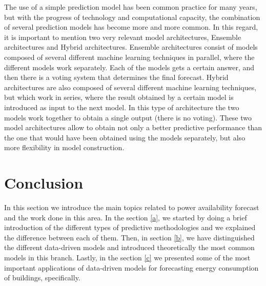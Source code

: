 The use of a simple prediction model has been common practice for many years, but with the progress of technology and computational capacity, the combination of several prediction models has become more and more common. In this regard, it is important to mention two very relevant model architectures, Ensemble architectures and Hybrid architectures. Ensemble architectures consist of models composed of several different machine learning techniques in parallel, where the different models work separately. Each of the models gets a certain answer, and then there is a voting system that determines the final forecast. Hybrid architectures are also composed of several different machine learning techniques, but which work in series, where the result obtained by a certain model is introduced as input to the next model. In this type of architecture the two models work together to obtain a single output (there is no voting). These two model architectures allow to obtain not only a better predictive performance than the one that would have been obtained using the models separately, but also more flexibility in model construction.


\section{Conclusion}

In this section we introduce the main topics related to power availability forecast and the work done in this area. In the section \ref{a}, we started by doing a brief introduction of the different types of predictive methodologies and we explained the difference between each of them. Then, in section \ref{b}, we have distinguished the different data-driven models and introduced theoretically the most common models in this branch. Lastly, in the section \ref{c} we presented some of the most important applications of data-driven models for forecasting energy consumption of buildings, specifically.
